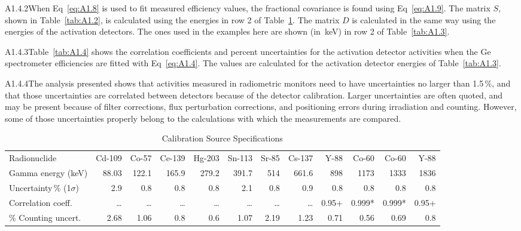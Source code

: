 \documentclass[12pt]{article}
\begin{document}
A1.4.2\quad When Eq~\ref{eq:A1.8} is used to fit measured efficiency values, the
fractional covariance is found using Eq~\ref{eq:A1.9}. The matrix $S$, shown in
Table~\ref{tab:A1.2}, is calculated using the energies in row 2 of Table~\ref{tab:A1.1}.
The matrix $D$ is calculated in the same way using the energies of the activation
detectors. The ones used in the examples here are shown (in~keV) in row 2 of
Table~\ref{tab:A1.3}.

A1.4.3\quad Table~\ref{tab:A1.4} shows the correlation coefficients and percent
uncertainties for the activation detector activities when the Ge spectrometer
efficiencies are fitted with Eq~\ref{eq:A1.4}. The values are calculated for the
activation detector energies of Table~\ref{tab:A1.3}.

A1.4.4\quad The analysis presented shows that activities measured in radiometric monitors
need to have uncertainties no larger than 1.5\,\%, and that those uncertainties are
correlated between detectors because of the detector calibration. Larger uncertainties
are often quoted, and may be present because of filter corrections, flux perturbation
corrections, and positioning errors during irradiation and counting. However, some of
those uncertainties properly belong to the calculations with which the measurements are
compared.

\begin{table}[ht]
\centering
\caption{Calibration Source Specifications}
\label{tab:A1.1}
\small
\begin{tabular}{lrrrrrrrrrrr}
\toprule
Radionuclide        & Cd-109 & Co-57 & Ce-139 & Hg-203 & Sn-113 & Sr-85 & Cs-137 & Y-88 & Co-60 & Co-60 & Y-88 \\
Gamma energy (keV)  & 88.03  & 122.1 & 165.9  & 279.2  & 391.7  & 514   & 661.6  & 898  & 1173  & 1333  & 1836 \\
Uncertainty\,\% (1$\sigma$) & 2.9 & 0.8 & 0.8 & 0.8 & 2.1 & 0.8 & 0.9 & 0.8 & 0.8 & 0.8 & 0.8 \\
Correlation coeff.  & \ldots & \ldots & \ldots & \ldots & \ldots & \ldots & \ldots & 0.95+ & 0.999* & 0.999* & 0.95+ \\
\% Counting uncert. & 2.68 & 1.06 & 0.8 & 0.6 & 1.07 & 2.19 & 1.23 & 0.71 & 0.56 & 0.69 & 0.8 \\
\bottomrule
\end{tabular}
\end{table}
\end{document}
